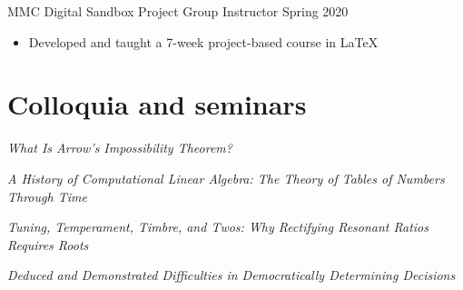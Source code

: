 \documentclass[10pt]{moderncv}
\begin{document}
MMC Digital Sandbox Project Group Instructor
\hfill Spring 2020
\begin{itemize}
    \item Developed and taught a 7-week project-based course in LaTeX
\end{itemize}

\section*{Colloquia and seminars}

\textit{What Is Arrow's Impossibility Theorem?}
\newline {}

\textit{A History of Computational Linear Algebra: The Theory of Tables of Numbers Through Time}
\newline {}

\textit{Tuning, Temperament, Timbre, and Twos: Why Rectifying Resonant Ratios Requires Roots}
\newline {}

\textit{Deduced and Demonstrated Difficulties in Democratically Determining Decisions}
\newline {}



\end{document}
